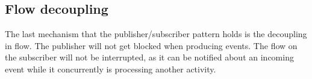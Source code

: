 \subsection{Flow decoupling}
The last mechanism that the publisher/subscriber pattern holds is the decoupling in flow. The publisher will not get blocked when producing events. The flow on the subscriber will not be interrupted, as it can be notified about an incoming event while it concurrently is processing another activity.
